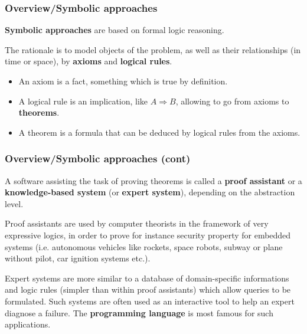 %
\begin{frame}
\frametitle{Overview/Symbolic approaches}

\textbf{Symbolic approaches} are based on formal logic reasoning. 

The rationale is to model objects of the problem, as well as their
relationships (in time or space), by \textbf{axioms} and
\textbf{logical rules}. 

\begin{itemize}

  \item An axiom is a fact, something which is true by definition.

  \item A logical rule is an implication, like \(A \Rightarrow B\),
  allowing to go from axioms to \textbf{theorems}.

  \item A theorem is a formula that can be deduced by logical rules
  from the axioms.

\end{itemize}

\end{frame}

%
\begin{frame}
\frametitle{Overview/Symbolic approaches
(cont)}

A software assisting the task of proving theorems is called a
\textbf{proof assistant} or a \textbf{knowledge-based system} (or
\textbf{expert system}), depending on the abstraction level. 

\bigskip

Proof assistants are used by computer theorists in the framework of
very expressive logics, in order to prove for instance security
property for embedded systems (i.e. autonomous vehicles like rockets,
space robots, subway or plane without pilot, car ignition systems
etc.).

\bigskip

Expert systems are more similar to a database of domain-specific
informations and logic rules (simpler than within proof assistants)
which allow queries to be formulated. Such systems are often used as
an interactive tool to help an expert diagnose a failure. The
\textbf{programming language \Prolog} is most famous for such
applications.

\end{frame}

